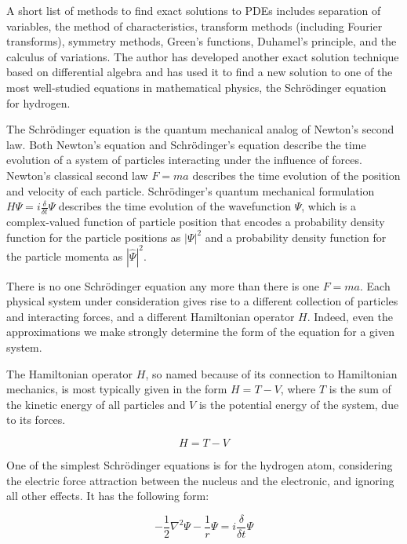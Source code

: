 \documentclass{article}
\begin{document}
A short list of methods to find exact solutions to PDEs includes separation of variables,
the method of characteristics, transform methods (including Fourier transforms),
symmetry methods, Green's functions, Duhamel's principle, and the calculus of variations.
The author has developed another exact solution technique based on differential algebra
and has used it to find a new solution to one of the most well-studied equations
in mathematical physics, the Schr\"odinger equation for hydrogen.

The Schr\"odinger equation is the quantum mechanical analog of Newton's second law.
Both Newton's equation and Schr\"odinger's equation
describe the time evolution of a system
of particles interacting under the influence of forces.
Newton's classical second law $F=ma$
describes the time evolution of the position and velocity of each particle.
Schr\"odinger's quantum mechanical formulation $H\Psi=i\frac{\delta}{\delta t} \Psi$
describes the time evolution
of the wavefunction $\Psi$, which is a complex-valued function of particle position
that encodes a probability density function for
the particle positions as $|\Psi|^2$ and a probability density function
for the particle momenta as $|\hat{\Psi}|^2$.

There is no one Schr\"odinger equation any more than there is one $F=ma$.
Each physical system under consideration gives rise to a different collection
of particles and interacting forces, and a different Hamiltonian operator $H$.
Indeed, even the approximations we
make strongly determine the form of the equation for a given system.

The Hamiltonian operator $H$, so named because of its connection to Hamiltonian
mechanics, is most typically given in the form $H=T-V$, where $T$ is the
sum of the kinetic energy of all particles and $V$ is the potential energy
of the system, due to its forces.

\begin{equation*}
H=T-V
\end{equation*}

One of the simplest Schr\"odinger equations is for the hydrogen atom,
considering the electric force attraction between the nucleus and
the electronic, and ignoring all other effects.  It has the following form:

\begin{equation*}
-\frac{1}{2}\nabla^2 \Psi - \frac{1}{r}\Psi = i \frac{\delta}{\delta t} \Psi
\end{equation*}
\end{document}
